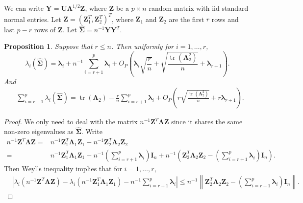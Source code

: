 \documentclass[12pt]{article} %
\DeclareMathOperator{\mytr}{tr}
\newcommand{\bZ}{\mathbf{Z}}
\newcommand{\bY}{\mathbf{Y}}
\newcommand{\bI}{\mathbf{I}}
\newcommand{\bU}{\mathbf{U}}
\newcommand{\bfsym}[1]{\ensuremath{\boldsymbol{#1}}}
\def\blambda {\bfsym {\lambda}}
\def\bLambda {\bfsym {\Lambda}}
\def\bSigma {\bfsym {\Sigma}}
\newtheorem{proposition}{Proposition}
\theoremstyle{definition}
\begin{document}
\begin{appendices}
We can write $\bY=\bU\bLambda^{1/2}\bZ$, where $\bZ$ be a $p\times n$ random matrix with iid standard normal entries.
    Let $\bZ =(\bZ_1^T,\bZ_2^T)^T$, where $\bZ_1$ and $\bZ_2$ are the first $r$ rows and last $p-r$ rows of $\bZ$.
    Let $\hat{\bSigma}=n^{-1}\bY\bY^T$.
\begin{proposition}
    \label{eigenvalueProp}
    Suppose that $r\leq n$.
    Then uniformly for $i=1,\ldots, r$, 
\begin{equation}\label{eigenvalueProp:R1}
    \lambda_i(\hat{\bSigma})
        =
        \blambda_i
        +
        n^{-1}\sum_{i=r+1}^p\blambda_i
        +O_P\left(\blambda_i \sqrt{\frac{r}{n}}+\sqrt{\frac{\mytr(\bLambda_2^2)}{ n}}+\blambda_{r+1}\right).
    \end{equation}
And 
\begin{equation}\label{eigenvalueProp:R2}
    \begin{split}
     &\sum_{i=r+1}^p\lambda_i(\hat{\bSigma})
    =
\mytr(\bLambda_2)
    -
    \frac{r}{n}\sum_{i=r+1}^p \blambda_i
    +O_P\left(r\sqrt{\frac{\mytr(\bLambda_2^2)}{ n}}+r\blambda_{r+1}\right)
    .
    \end{split}
\end{equation}
\end{proposition}
\begin{proof}
    We only need to deal with the matrix $n^{-1}\bZ^T \bLambda \bZ$ since it shares the same non-zero eigenvalues as $\hat{\bSigma}$.
    Write
    \begin{equation*}
        \begin{split}
        n^{-1}\bZ^T \bLambda \bZ=&
        n^{-1}\bZ_1^T \bLambda_1 \bZ_1+
        n^{-1}\bZ_2^T \bLambda_2 \bZ_2
        \\
        =&
        n^{-1}\bZ_1^T \bLambda_1 \bZ_1+
        n^{-1}(\sum_{i=r+1}^p\blambda_i)\bI_n+
        n^{-1}\left(\bZ_2^T \bLambda_2 \bZ_2-(\sum_{i=r+1}^p\blambda_i)\bI_n\right)
        .
        \end{split}
    \end{equation*}
    Then Weyl's inequality implies that for $ i=1,\ldots, r$,
    \begin{equation}\label{eigenBoundForF}
        \begin{split}
        &
        \left|
        \lambda_i\left(n^{-1}\bZ^T \bLambda \bZ\right)
        -
        \lambda_i(n^{-1}\bZ_1^T \bLambda_1 \bZ_1)
        -
        n^{-1}\sum_{i=r+1}^p\blambda_i
        \right|
        \leq
        n^{-1}\left\|\bZ_2^T \bLambda_2 \bZ_2-(\sum_{i=r+1}^p\blambda_i)\bI_n\right\|.

\end{split}
\end{equation}
\end{proof}
\end{appendices}
\end{document}

